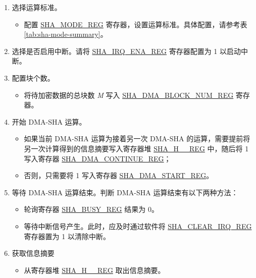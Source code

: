 \documentclass[main\_\_CN.tex]{subfiles}
\begin{document}
\begin{enumerate}
    \item 选择运算标准。
    \begin{itemize}
        \item 配置 \hyperref[regdesc:SHAMODEREG]{SHA\_MODE\_REG} 寄存器，设置运算标准。具体配置，请参考表 \ref{tab:sha-mode-summary}。
    \end{itemize}
    \item 选择是否启用中断。请将 \hyperref[regdesc:SHAIRQENAREG]{SHA\_IRQ\_ENA\_REG} 寄存器配置为 1 以启动中断。
    \item 配置块个数。
    \begin{itemize}
        \item  将待加密数据的总块数 {\it{M}} 写入  \hyperref[regdesc:SHADMABLOCKNUMREG]{SHA\_DMA\_BLOCK\_NUM\_REG} 寄存器。
    \end{itemize}
    \item 开始 DMA-SHA 运算。
        \begin{itemize}
            \item 如果当前 DMA-SHA 运算为接着另一次 DMA-SHA 的运算，需要提前将另一次计算得到的信息摘要写入寄存器堆 \hyperref[regdesc:SHAHNREG]{SHA\_H\_\_REG} 中，随后将 1 写入寄存器 \hyperref[regdesc:SHADMACONTINUEREG]{SHA\_DMA\_CONTINUE\_REG}；
            \item 否则，只需要将 1 写入寄存器 \hyperref[regdesc:SHADMASTARTREG]{SHA\_DMA\_START\_REG}。
        \end{itemize}
    \item 等待 DMA-SHA 运算结束。判断 DMA-SHA 运算结束有以下两种方法：
        \begin{itemize}
            \item 轮询寄存器 \hyperref[regdesc:SHABUSYREG]{SHA\_BUSY\_REG} 结果为 0。
            \item 等待中断信号产生。此时，应及时通过软件将 \hyperref[regdesc:SHACLEARIRQREG]{SHA\_CLEAR\_IRQ\_REG} 寄存器置为 1 以清除中断。
        \end{itemize}
    
    \item 获取信息摘要
    \begin{itemize}
        \item 从寄存器堆 \hyperref[regdesc:SHAHNREG]{SHA\_H\_\_REG} 取出信息摘要。
    \end{itemize}
    
\end{enumerate}

\end{document}
